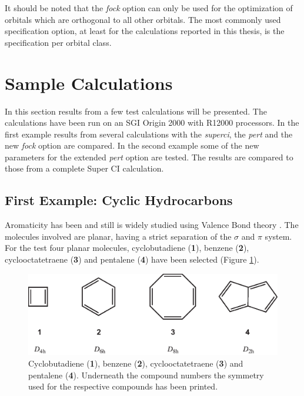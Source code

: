 It should be noted that the \textit{fock} option can only be used for the optimization of orbitals which are orthogonal to all other orbitals. The most commonly used specification option, at least for the calculations reported in this thesis, is the specification per orbital class. 

\section{Sample Calculations}

In this section results from a few test calculations will be presented. The calculations have been run on an SGI Origin 2000 with R12000 processors. In the first example results from several calculations with the \textit{superci}, the \textit{pert} and the new \textit{fock} option are compared.  In the second example some of the new parameters for the extended \textit{pert} option are tested. The results are compared to those from a complete Super CI calculation.

\subsection{\label{ch2.sec.aromat}First Example: Cyclic Hydrocarbons}

Aromaticity has been and still is widely studied using Valence Bond theory \cite{cooper1,cooper2,remcolowdin,indacene,fowler,jenneskens,cyclohexatriene,bestbenzene,benzyne}. The molecules involved are planar, having a strict separation of the $\sigma$ and $\pi$ system. For the test four planar molecules, cyclobutadiene (\textbf{1}), benzene (\textbf{2}), cyclooctatetraene (\textbf{3}) and pentalene (\textbf{4}) have been selected (Figure \ref{ch2.fig.compounds}).
\begin{figure}[htdp]
\center
\includegraphics[scale=0.85]{orbopt/figures/compounds.eps}
\caption{Cyclobutadiene (\textbf{1}), benzene (\textbf{2}), cyclooctatetraene (\textbf{3}) and pentalene (\textbf{4}). Underneath the compound numbers the symmetry used for the respective compounds has been printed.}
\label{ch2.fig.compounds}
\end{figure}

